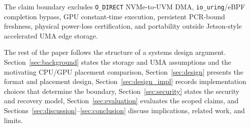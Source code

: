The claim boundary excludes \texttt{O\_DIRECT} NVMe-to-UVM DMA, \texttt{io\_uring}/eBPF completion bypass, GPU constant-time execution, persistent PCR-bound freshness, physical power-loss certification, and portability outside Jetson-style accelerated UMA edge storage.

The rest of the paper follows the structure of a systems design argument.  Section~\ref{sec:background} states the storage and UMA assumptions and the motivating CPU/GPU placement comparison, Section~\ref{sec:design} presents the format and placement design, Section~\ref{sec:design_impl} records implementation choices that determine the boundary, Section~\ref{sec:security} states the security and recovery model, Section~\ref{sec:evaluation} evaluates the scoped claims, and Sections~\ref{sec:discussion}--\ref{sec:conclusion} discuss implications, related work, and limits.
